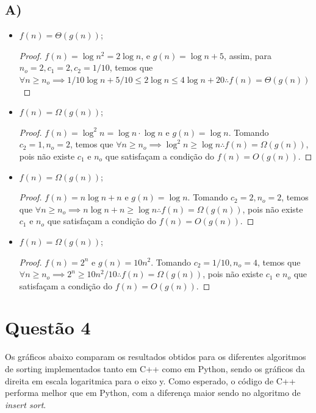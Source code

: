 \documentclass{article}
\begin{document}
\subsection*{A)}
\begin{itemize}
  \item $f(n) = \Theta(g(n))$;
  \begin{proof}
  $f(n) = \log{n^2} = 2\log{n}$, e $g(n) = \log{n} +5$, assim, para $n_o=2,c_1 = 2,c_2=1/10$, temos que
  $\forall n\geq n_o \implies 1/10\log{n}+5/10 \leq 2\log{n} \leq 4\log{n} + 20 \therefore f(n) = \Theta(g(n))$
  \end{proof}

  \item
  $f(n) = \Omega(g(n))$;
  \begin{proof}
  $f(n) = \log^2{n} = \log{n}\cdot\log{n}$ e $g(n) = \log{n}$. Tomando $c_2=1,n_o = 2$, temos que
  $\forall n \geq  n_o \implies \log^2{n} \geq  \log{n} \therefore f(n) = \Omega(g(n))$, pois não existe $c_1$ e $n_o$
  que satisfaçam a condição do $f(n) = O(g(n))$.
  \end{proof}

  \item
  $f(n) = \Omega(g(n))$;
  \begin{proof}
  $f(n) = n\log{n} + n$ e $g(n) = \log{n}$. Tomando $c_2=2,n_o = 2$, temos que
  $\forall n \geq  n_o \implies n\log{n} + n \geq  \log{n} \therefore f(n) = \Omega(g(n))$, pois não existe $c_1$ e $n_o$
  que satisfaçam a condição do $f(n) = O(g(n))$.
  \end{proof}

  \item
  $f(n) = \Omega(g(n))$;
  \begin{proof}
  $f(n) = 2^n$ e $g(n) =10n^2$. Tomando $c_2=1/10,n_o = 4$, temos que
  $\forall n \geq  n_o \implies 2^n \geq  10n^2/10 \therefore f(n) = \Omega(g(n))$, pois não existe $c_1$ e $n_o$
  que satisfaçam a condição do $f(n) = O(g(n))$.
  \end{proof}


\end{itemize}

\section*{Questão 4}

Os gráficos abaixo comparam os resultados obtidos para os diferentes algoritmos de sorting
implementados tanto em C++ como em Python, sendo os gráficos da direita em escala logaritmica para o eixo y.
Como esperado, o código de C++ performa melhor
que em Python, com a diferença maior sendo no algoritmo de {\it insert sort}.
\end{document}
